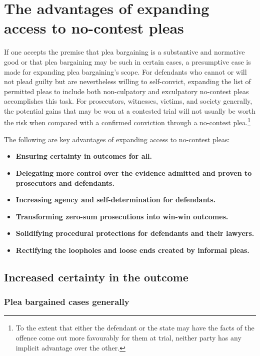 \section{The advantages of expanding access to no-contest pleas}

If one accepts the premise that plea bargaining is a substantive and normative good or that plea bargaining may be such in certain cases, a presumptive case is made for expanding plea bargaining's scope. For defendants who cannot or will not plead guilty but are nevertheless willing to self-convict, expanding the list of permitted pleas to include both non-culpatory and exculpatory no-contest pleas accomplishes this task. For prosecutors, witnesses, victims, and society generally, the potential gains that may be won at a contested trial will not usually be worth the risk when compared with a confirmed conviction through a no-contest plea.\footnote{To the extent that either the defendant or the state may have the facts of the offence come out more favourably for them at trial, neither party has any implicit advantage over the other.}

The following are key advantages of expanding access to no-contest pleas:

\begin{itemize}
    \item \textbf{Ensuring certainty in outcomes for all.}
    \item \textbf{Delegating more control over the evidence admitted and proven to prosecutors and defendants.}
    \item \textbf{Increasing agency and self-determination for defendants.}
    \item \textbf{Transforming zero-sum prosecutions into win-win outcomes.}
    \item \textbf{Solidifying procedural protections for defendants and their lawyers.}
    \item \textbf{Rectifying the loopholes and loose ends created by informal pleas.}
\end{itemize}

\subsection{Increased certainty in the outcome}

\subsubsection{Plea bargained cases generally}

